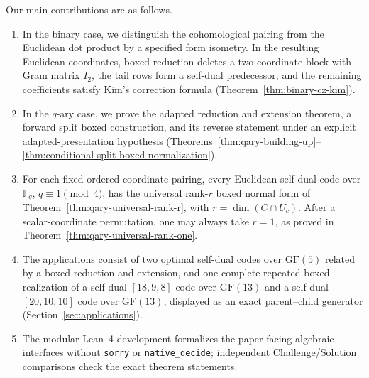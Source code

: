 \documentclass[12pt]{article}
\newcommand{\F}{\mathbb{F}}
\newcommand{\GF}[1]{\ensuremath{\mathrm{GF}(#1)}}
\begin{document}
Our main contributions are as follows.
\begin{enumerate}[label=(\arabic*)]



\item In the binary case, we distinguish the cohomological pairing from the
Euclidean dot product by a specified form isometry. In the resulting
Euclidean coordinates, boxed reduction deletes a two-coordinate block with
Gram matrix \(I_2\), the tail rows form a self-dual predecessor, and the
remaining coefficients satisfy Kim's correction formula
(Theorem~\ref{thm:binary-cz-kim}).

\item In the \(q\)-ary case, we prove the adapted reduction and extension
theorem, a forward split boxed construction, and its reverse statement under
an explicit adapted-presentation hypothesis
(Theorems~\ref{thm:qary-building-up}--\ref{thm:conditional-split-boxed-normalization}).

\item For each fixed ordered coordinate pairing, every Euclidean self-dual
code over \(\F_q\), \(q\equiv1\pmod4\), has the universal rank-\(r\) boxed
normal form of Theorem~\ref{thm:qary-universal-rank-r}, with
\(r=\dim(C\cap U_c)\).  After a scalar-coordinate permutation, one may
always take \(r=1\), as proved in
Theorem~\ref{thm:qary-universal-rank-one}.

\item The applications consist of two optimal self-dual codes over
\(\GF{5}\) related by a boxed reduction and extension, and one complete
repeated boxed realization of a self-dual \([18,9,8]\) code over
\(\GF{13}\) and a self-dual \([20,10,10]\) code over \(\GF{13}\), displayed
as an exact parent--child generator (Section~\ref{sec:applications}).

\item The modular Lean~4 development formalizes the paper-facing algebraic
interfaces without \texttt{sorry} or \texttt{native\_decide}; independent
Challenge/Solution comparisons check the exact theorem statements.
\end{enumerate}
\end{document}
